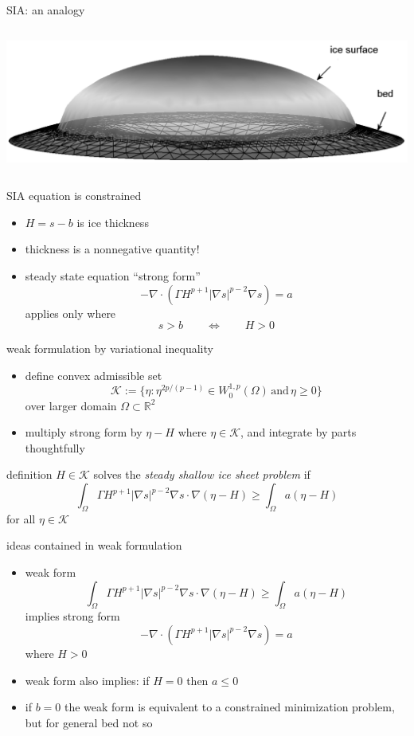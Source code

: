 \documentclass[hide notes,intlimits]{beamer}
\newcommand{\RR}{\mathbb{R}}
\newcommand{\Kcal}{\mathcal{K}}
\newcommand{\Div}{\nabla\cdot}
\newcommand{\grad}{\nabla}
\begin{document}
\begin{frame}{SIA: an analogy}
\begin{columns}
\begin{column}{0.55\textwidth}
\begin{center}
\vspace{10mm}
\includegraphics[width=1.05\textwidth]{capnonflatobs}
\end{center}
\end{column}
\end{columns}
\end{frame}


\begin{frame}{SIA equation is constrained} 
\begin{itemize}
\item $H=s-b$ is ice thickness
\item thickness is a nonnegative quantity!
\item steady state equation ``strong form''
  $$-\Div \left(\Gamma H^{p+1} |\nabla s|^{p-2} \nabla s  \right) =  a$$
applies only where
  $$s>b \qquad \iff \qquad H > 0$$
\end{itemize}
\end{frame}


\begin{frame}{weak formulation by variational inequality} 
\begin{itemize}
\item define convex admissible set
  $$\Kcal := \{\eta : \eta^{2p/(p-1)} \in W^{1,p}_0 (\Omega) \,\text{and}\, \eta \ge 0\}$$
over larger domain $\Omega \subset \RR^2$
\item multiply strong form by $\eta-H$ where $\eta\in \Kcal$, and integrate by parts thoughtfully
\end{itemize}
\begin{block}{definition} 
$H \in \Kcal$ solves the \emph{steady shallow ice sheet problem} if
  $$\int_{\Omega}  \Gamma H^{p+1} |\grad s|^{p-2} \grad s \cdot \grad(\eta - H)  
\ge \int_{\Omega} a (\eta - H)$$
for all $\eta \in \Kcal$
\end{block}
\end{frame}


\begin{frame}{ideas contained in weak formulation} 
\begin{itemize}
\item weak form
  $$\int_{\Omega}  \Gamma H^{p+1} |\grad s|^{p-2} \grad s \cdot \grad(\eta - H)  
\ge \int_{\Omega} a (\eta - H)$$
implies strong form
  $$-\Div \left(\Gamma H^{p+1} |\nabla s|^{p-2} \nabla s  \right) =  a$$
where $H>0$
\item weak form also implies: if $H=0$ then $a \le 0$
\item if $b=0$ the weak form is equivalent to a constrained minimization problem, but for general bed not so
\end{itemize}
\end{frame}
\end{document}
